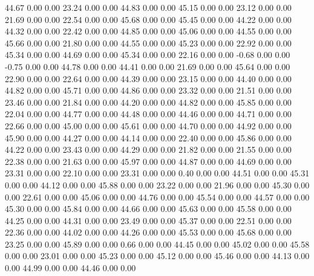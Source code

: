    44.67   0.00   0.00
   23.24   0.00   0.00
   44.83   0.00   0.00
   45.15   0.00   0.00
   23.12   0.00   0.00
   21.69   0.00   0.00
   22.54   0.00   0.00
   45.68   0.00   0.00
   45.45   0.00   0.00
   44.22   0.00   0.00
   44.32   0.00   0.00
   22.42   0.00   0.00
   44.85   0.00   0.00
   45.06   0.00   0.00
   44.55   0.00   0.00
   45.66   0.00   0.00
   21.80   0.00   0.00
   44.55   0.00   0.00
   45.23   0.00   0.00
   22.92   0.00   0.00
   45.34   0.00   0.00
   44.69   0.00   0.00
   45.34   0.00   0.00
   22.16   0.00   0.00
   -0.68   0.00   0.00
   -0.75   0.00   0.00
   44.78   0.00   0.00
   44.41   0.00   0.00
   21.69   0.00   0.00
   45.64   0.00   0.00
   22.90   0.00   0.00
   22.64   0.00   0.00
   44.39   0.00   0.00
   23.15   0.00   0.00
   44.40   0.00   0.00
   44.82   0.00   0.00
   45.71   0.00   0.00
   44.86   0.00   0.00
   23.32   0.00   0.00
   21.51   0.00   0.00
   23.46   0.00   0.00
   21.84   0.00   0.00
   44.20   0.00   0.00
   44.82   0.00   0.00
   45.85   0.00   0.00
   22.04   0.00   0.00
   44.77   0.00   0.00
   44.48   0.00   0.00
   44.46   0.00   0.00
   44.71   0.00   0.00
   22.66   0.00   0.00
   45.00   0.00   0.00
   45.61   0.00   0.00
   44.70   0.00   0.00
   44.92   0.00   0.00
   45.90   0.00   0.00
   44.27   0.00   0.00
   44.14   0.00   0.00
   22.40   0.00   0.00
   45.86   0.00   0.00
   44.22   0.00   0.00
   23.43   0.00   0.00
   44.29   0.00   0.00
   21.82   0.00   0.00
   21.55   0.00   0.00
   22.38   0.00   0.00
   21.63   0.00   0.00
   45.97   0.00   0.00
   44.87   0.00   0.00
   44.69   0.00   0.00
   23.31   0.00   0.00
   22.10   0.00   0.00
   23.31   0.00   0.00
    0.40   0.00   0.00
   44.51   0.00   0.00
   45.31   0.00   0.00
   44.12   0.00   0.00
   45.88   0.00   0.00
   23.22   0.00   0.00
   21.96   0.00   0.00
   45.30   0.00   0.00
   22.61   0.00   0.00
   45.06   0.00   0.00
   44.76   0.00   0.00
   45.54   0.00   0.00
   44.57   0.00   0.00
   45.30   0.00   0.00
   45.84   0.00   0.00
   44.66   0.00   0.00
   45.63   0.00   0.00
   45.58   0.00   0.00
   44.25   0.00   0.00
   44.31   0.00   0.00
   23.49   0.00   0.00
   45.37   0.00   0.00
   22.51   0.00   0.00
   22.36   0.00   0.00
   44.02   0.00   0.00
   44.26   0.00   0.00
   45.53   0.00   0.00
   45.68   0.00   0.00
   23.25   0.00   0.00
   45.89   0.00   0.00
    0.66   0.00   0.00
   44.45   0.00   0.00
   45.02   0.00   0.00
   45.58   0.00   0.00
   23.01   0.00   0.00
   45.23   0.00   0.00
   45.12   0.00   0.00
   45.46   0.00   0.00
   44.13   0.00   0.00
   44.99   0.00   0.00
   44.46   0.00   0.00
